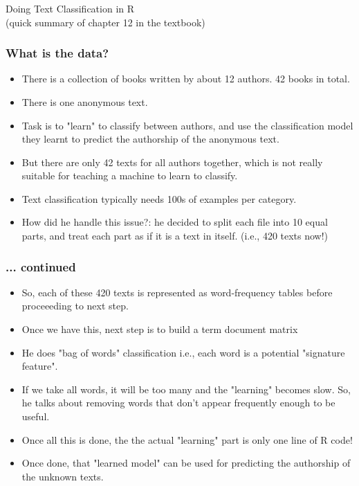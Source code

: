\documentclass{beamer}
\begin{document}
\begin{frame}
\frametitle{}
\Large Doing Text Classification in R
\\ \tiny (quick summary of chapter 12 in the textbook)
\end{frame}

\begin{frame}
\frametitle{What is the data?}
\begin{itemize}
\item There is a collection of books written by about 12 authors. 42 books in total.
\item There is one anonymous text. 
\item Task is to "learn" to classify between authors, and use the classification model they learnt to predict the authorship of the anonymous text.
\pause \item But there are only 42 texts for all authors together, which is not really suitable for teaching a machine to learn to classify. 
\item Text classification typically needs 100s of examples per category. 
\item How did he handle this issue?: he decided to split each file into 10 equal parts, and treat each part as if it is a text in itself. (i.e., 420 texts now!)
\end{itemize}
\end{frame}

\begin{frame}
\frametitle{... continued}
\begin{itemize}
\item So, each of these 420 texts is represented as word-frequency tables before proceeeding to next step. \pause
\item Once we have this, next step is to build a term document matrix \pause 
\item He does "bag of words" classification i.e., each word is a potential "signature feature". \pause
\item If we take all words, it will be too many and the "learning" becomes slow. So, he talks about removing words that don't appear frequently enough to be useful. 
\item Once all this is done, the the actual "learning" part is only one line of R code!
\item Once done, that "learned model" can be used for predicting the authorship of the unknown texts. 
\end{itemize} 
\end{frame}
\end{document}
